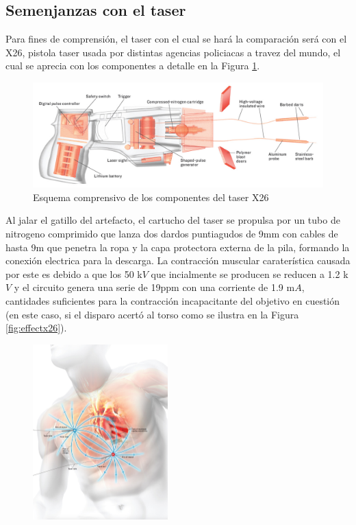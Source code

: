 \documentclass[letterpaper, 12pt]{article}
\begin{document}
\begin{justify}
        \subsection{Semenjanzas con el taser}
        \justify
        Para fines de comprensión, el taser con el cual se hará la comparación será con el X26, pistola taser usada por distintas agencias policiacas a travez del mundo, el cual se aprecia con los componentes a detalle en la Figura \ref{fig:X26}. \\
        \begin{figure}[ht]
            \centering
            \includegraphics[width=12cm]{tasersqueme.jpeg}
            \caption{Esquema comprensivo de los componentes del taser X26}
            \label{fig:X26}
        \end{figure}
        \justify
        Al jalar el gatillo del artefacto, el cartucho del taser se propulsa por un tubo de nitrogeno comprimido que lanza dos dardos puntiagudos de 9mm con cables de hasta 9m que penetra la ropa y la capa protectora externa de la pila, formando
        la conexión electrica para la descarga. La contracción muscular caraterística causada por este es debido a que los 50 k\(V\) que incialmente se producen se reducen a 1.2 k\(V\) y el circuito genera una serie de 19ppm con una corriente de 1.9 m\(A\),
        cantidades suficientes para la contracción incapacitante del objetivo en cuestión (en este caso, si el disparo acertó al torso como se ilustra en la Figura \ref{fig:effectx26}).
        \begin{figure}[H]
            \centering
            \includegraphics[width=5.2cm]{effectivecont.jpeg}

\end{figure}
\end{justify}
\end{document}
